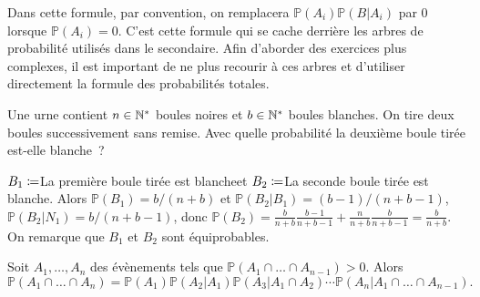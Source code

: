 \documentclass{magnolia}
\begin{document}
\begin{remarques}
\remarque Dans cette formule, par convention, on remplacera
  $\mathbb{P}(A_i)\mathbb{P}(B|A_i)$ par $0$ lorsque $\mathbb{P}(A_i)=0$.
\remarque C'est cette formule qui se cache derrière les arbres de probabilité
  utilisés dans le secondaire. Afin d'aborder des exercices plus complexes,
  il est important de ne plus recourir à ces arbres et d'utiliser directement la formule
  des probabilités totales.
\end{remarques}
\vspace{1ex}
\begin{exoUnique}
\exo Une urne contient $n\in{\mathbb{N}^*}$ boules noires et $b\in{\mathbb{N}^*}$ boules blanches. On tire deux boules
  successivement sans remise. Avec quelle probabilité la deuxième boule tirée est-elle
  blanche~?
\begin{sol}
$B_1\coloneqq$\og La première boule tirée est blanche\fg et 
$B_2\coloneqq$\og La seconde boule tirée est blanche\fg. Alors $\mathbb{P}(B_1)=b/(n+b)$ et $\mathbb{P}(B_2|B_1)=(b-1)/(n+b-1)$,
$\mathbb{P}(B_2|N_1)=b/(n+b-1)$, donc $\mathbb{P}(B_2)=\frac{b}{n+b}\frac{b-1}{n+b-1}+\frac{n}{n+b}\frac{b}{n+b-1}=\frac{b}{n+b}$.
On remarque que $B_1$ et $B_2$ sont équiprobables.
\end{sol}
\end{exoUnique}

\begin{proposition}[nom={Formule des probabilités composées}]
  Soit $A_1,\ldots,A_n$ des évènements tels que $\mathbb{P}(A_1\cap\ldots\cap A_{n-1})>0$.
  Alors
  \[\mathbb{P}(A_1\cap\ldots\cap A_n)=
    \mathbb{P}(A_1)\mathbb{P}(A_2|A_1)\mathbb{P}(A_3|A_1\cap A_2)
    \cdots \mathbb{P}(A_n|A_1\cap\ldots\cap A_{n-1}).\]
\end{proposition}
  
\end{document}
